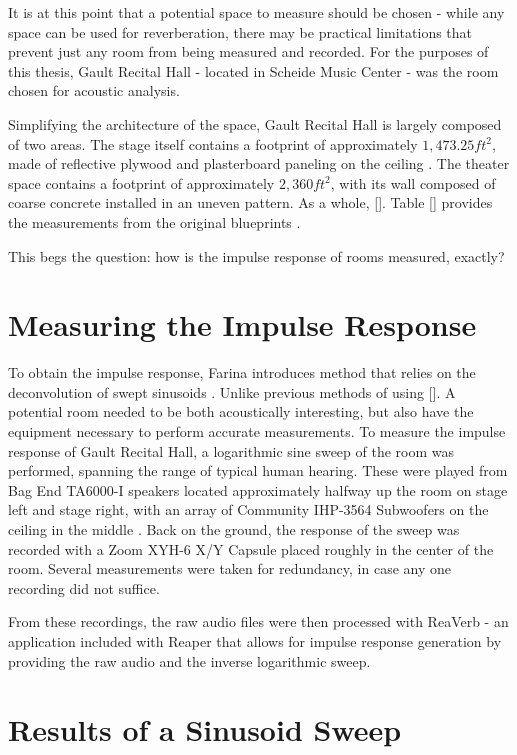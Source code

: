 It is at this point that a potential space to measure should be chosen - while any space can be used for reverberation, there may be practical limitations that prevent just any room from being measured and recorded. For the purposes of this thesis, Gault Recital Hall - located in Scheide Music Center - was the room chosen for acoustic analysis.

Simplifying the architecture of the space, Gault Recital Hall is largely composed of two areas. The stage itself contains a footprint of approximately $1,473.25 ft^{2}$, made of reflective plywood and plasterboard paneling on the ceiling \cite{construction, woogault}. The theater space contains a footprint of approximately $2,360 ft^{2}$, with its wall composed of coarse concrete installed in an uneven pattern. As a whole, []. Table [] provides the measurements from the original blueprints \cite{construction}.

This begs the question: how is the impulse response of rooms measured, exactly?

\section{Measuring the Impulse Response}
To obtain the impulse response, Farina introduces method that relies on the deconvolution of swept sinusoids \cite{farina2000simultaneous}. Unlike previous methods of using []. A potential room needed to be both acoustically interesting, but also have the equipment necessary to perform accurate measurements. To measure the impulse response of Gault Recital Hall, a logarithmic sine sweep of the room was performed, spanning the range of typical human hearing. These were played from Bag End TA6000-I speakers located approximately halfway up the room on stage left and stage right, with an array of Community IHP-3564 Subwoofers on the ceiling in the middle \cite{woosound}. Back on the ground, the response of the sweep was recorded with a Zoom XYH-6 X/Y Capsule placed roughly in the center of the room. Several measurements were taken for redundancy, in case any one recording did not suffice.

From these recordings, the raw audio files were then processed with ReaVerb - an application included with Reaper that allows for impulse response generation by providing the raw audio and the inverse logarithmic sweep.

\section{Results of a Sinusoid Sweep}
